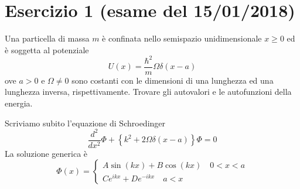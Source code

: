 \documentclass[a4paper]{article}
\begin{document}
    \section*{Esercizio 1 (esame del 15/01/2018)}
        Una particella di massa $m$ è confinata nello semispazio unidimensionale $x\geq0$ ed è soggetta al potenziale
        \begin{equation*}
            U(x)=\frac{\hbar^2}{m}\Omega\delta(x-a)
        \end{equation*}
        ove $a>0$ e $\Omega\neq0$ sono costanti con le dimensioni di una lunghezza ed una lunghezza inversa, rispettivamente. 
        Trovare gli autovalori e le autofunzioni della energia.
        \begin{figure}[H]
            \centering
        \end{figure}
        Scriviamo subito l'equazione di Schroedinger
        \begin{equation*}
            \frac{d^2}{dx^2}\Phi+\left\{k^2+2\Omega\delta(x-a)\right\}\Phi=0
        \end{equation*}
        La soluzione generica è
        \begin{equation*}
            \Phi(x)=
            \begin{cases}
                A\sin(kx)+B\cos(kx)\quad 0<x<a\\
                Ce^{ikx}+De^{-ikx}\quad a<x
            \end{cases}
        \end{equation*}
\end{document}
